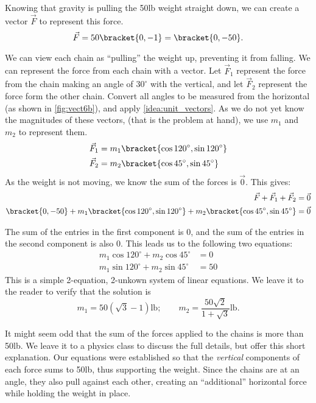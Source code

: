 {Knowing that gravity is pulling the 50lb weight straight down, we can create a vector $\vec F$ to represent this force. 
$$\vec F = 50\bracket{0,-1}=\bracket{0,-50}.$$

We can view each chain as ``pulling'' the weight up, preventing it from falling. We can represent the force from each chain with a vector. Let $\vec F_1$ represent the force from the chain making an angle of $30^\circ$ with the vertical, and let $\vec F_2$ represent the force form the other chain. Convert all angles to be measured from the horizontal (as shown in \autoref{fig:vect6b}), and apply \autoref{idea:unit_vectors}. As we do not yet know the magnitudes of these vectors, (that is the problem at hand), we use $m_1$ and $m_2$ to represent them.
\begin{align*}
\vec F_1 &= m_1\bracket{\cos 120^\circ,\sin120^\circ} \\
\vec F_2 &= m_2\bracket{\cos 45^\circ,\sin45^\circ}
\end{align*}
As the weight is not moving, we know the sum of the forces is $\vec 0$. This gives:
\begin{align*}
\vec F + \vec F_1 + \vec F_2 & = \vec 0\\
\bracket{0,-50}+ m_1\bracket{\cos 120^\circ,\sin120^\circ}+ m_2\bracket{\cos 45^\circ,\sin45^\circ}&=\vec 0
\end{align*}

The sum of the entries in the first component is 0, and the sum of the entries in the second component is also 0. This leads us to the following two equations:
\begin{align*}
m_1\cos120^\circ + m_2\cos45^\circ &=0 \\
m_1\sin120^\circ + m_2\sin45^\circ &=50
\end{align*}
This is a simple 2-equation, 2-unkown system of linear equations. We leave it to the reader to verify that the solution is 
\[
m_1=50(\sqrt{3}-1)\text{lb}%
;\qquad
m_2=\frac{50\sqrt{2}}{1+\sqrt{3}}\text{lb}.%
\]

It might seem odd that the sum of the forces applied to the chains is more than 50lb. We leave it to a physics class to discuss the full details, but offer this short explanation. Our equations were established so that the \textit{vertical} components of each force sums to 50lb, thus supporting the weight. Since the chains are at an angle, they also pull against each other, creating an ``additional'' horizontal force while holding the weight in place.}

